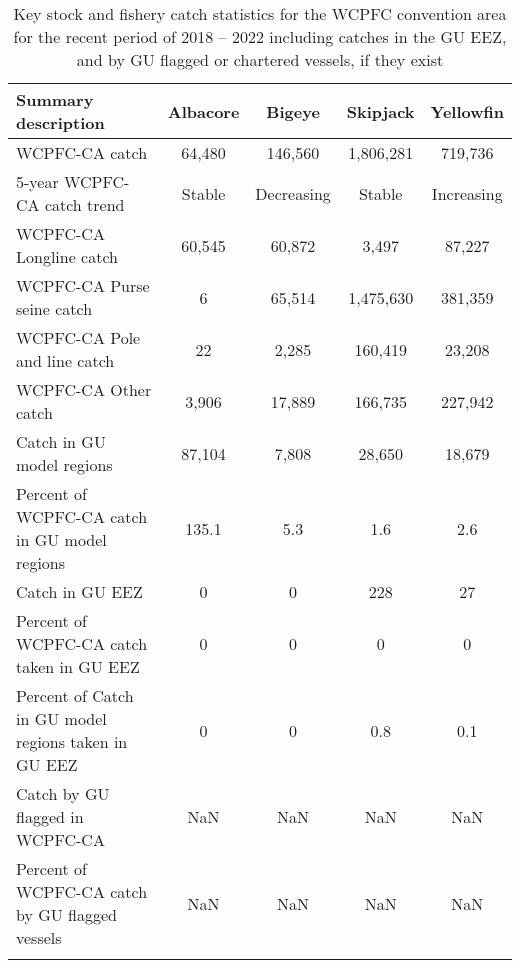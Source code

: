 \begin{longtable}{lcccc}
\caption{Key stock and fishery catch statistics for the WCPFC convention area for the recent period of 2018 -- 2022 including catches in the GU EEZ, and by GU flagged or chartered vessels, if they exist} \\ 
  \hline
Summary description & Albacore & Bigeye & Skipjack & Yellowfin \\ 
  \hline
WCPFC-CA catch & 64,480 & 146,560 & 1,806,281 & 719,736 \\ 
  5-year WCPFC-CA catch trend & Stable & Decreasing & Stable & Increasing \\ 
  WCPFC-CA Longline catch & 60,545 & 60,872 & 3,497 & 87,227 \\ 
  WCPFC-CA Purse seine catch & 6 & 65,514 & 1,475,630 & 381,359 \\ 
  WCPFC-CA Pole and line catch & 22 & 2,285 & 160,419 & 23,208 \\ 
  WCPFC-CA Other catch & 3,906 & 17,889 & 166,735 & 227,942 \\ 
  Catch in GU model regions & 87,104 & 7,808 & 28,650 & 18,679 \\ 
  Percent of WCPFC-CA catch in GU model regions & 135.1 & 5.3 & 1.6 & 2.6 \\ 
   \hline
Catch in GU EEZ & 0 & 0 & 228 & 27 \\ 
  Percent of WCPFC-CA catch taken in GU EEZ & 0 & 0 & 0 & 0 \\ 
  Percent of Catch in GU model regions taken in GU EEZ & 0 & 0 & 0.8 & 0.1 \\ 
  Catch by GU flagged in WCPFC-CA & NaN & NaN & NaN & NaN \\ 
  Percent of WCPFC-CA catch by GU flagged vessels & NaN & NaN & NaN & NaN \\ 
  \hline
\label{cat_sum_tab}
\end{longtable}
